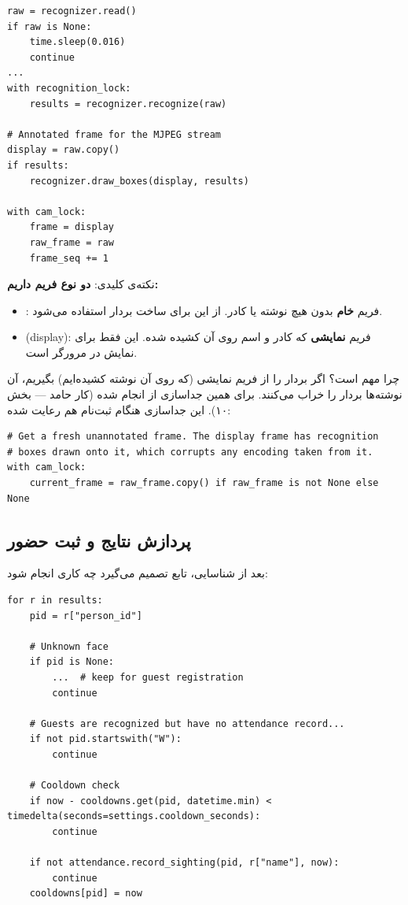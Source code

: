 \documentclass[12pt,a4paper]{article}
\begin{document}
\begin{latin}
\begin{lstlisting}
raw = recognizer.read()
if raw is None:
    time.sleep(0.016)
    continue
...
with recognition_lock:
    results = recognizer.recognize(raw)

# Annotated frame for the MJPEG stream
display = raw.copy()
if results:
    recognizer.draw_boxes(display, results)

with cam_lock:
    frame = display
    raw_frame = raw
    frame_seq += 1
\end{lstlisting}
\end{latin}

نکته‌ی کلیدی: \textbf{دو نوع فریم داریم:}
\begin{itemize}[rightmargin=0pt]
  \item {}: فریم \textbf{خام} بدون هیچ نوشته یا کادر. از این برای ساخت بردار استفاده می‌شود.
  \item {} (display): فریم \textbf{نمایشی} که کادر و اسم روی آن کشیده شده. این فقط برای نمایش در مرورگر است.
\end{itemize}

\begin{note}
چرا مهم است؟ اگر بردار را از فریم نمایشی (که روی آن نوشته کشیده‌ایم) بگیریم، آن نوشته‌ها بردار را خراب می‌کنند. برای همین جداسازی  از  انجام شده (کار حامد — بخش ۱۰). این جداسازی هنگام ثبت‌نام هم رعایت شده:
\begin{latin}
\begin{lstlisting}
# Get a fresh unannotated frame. The display frame has recognition
# boxes drawn onto it, which corrupts any encoding taken from it.
with cam_lock:
    current_frame = raw_frame.copy() if raw_frame is not None else None
\end{lstlisting}
\end{latin}
\end{note}

\subsection{پردازش نتایج و ثبت حضور}
بعد از شناسایی، تابع  تصمیم می‌گیرد چه کاری انجام شود:

\begin{latin}
\begin{lstlisting}
for r in results:
    pid = r["person_id"]

    # Unknown face
    if pid is None:
        ...  # keep for guest registration
        continue

    # Guests are recognized but have no attendance record...
    if not pid.startswith("W"):
        continue

    # Cooldown check
    if now - cooldowns.get(pid, datetime.min) < timedelta(seconds=settings.cooldown_seconds):
        continue

    if not attendance.record_sighting(pid, r["name"], now):
        continue
    cooldowns[pid] = now
\end{lstlisting}
\end{latin}
\end{document}
